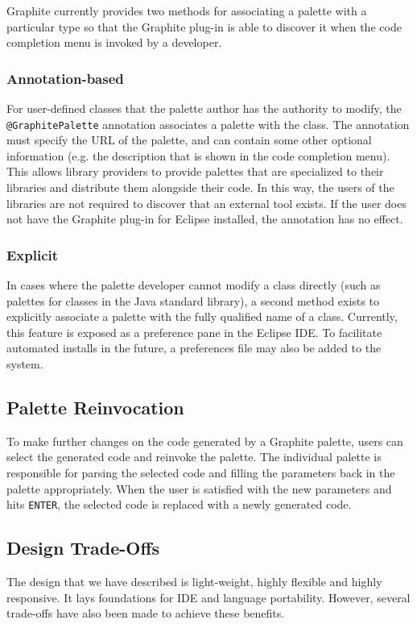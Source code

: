 \documentclass[10pt, conference, compsocconf]{IEEEtran}
\begin{document}
Graphite currently provides two methods for associating a palette with a particular type so that the Graphite plug-in is able to discover it when the code completion menu is invoked by a developer.

\subsubsection{Annotation-based}
For user-defined classes that the palette author has the authority to modify, the \texttt{@GraphitePalette} annotation associates a palette with the class. The annotation must specify the URL of the palette, and can contain some other optional information (e.g. the description that is shown in the code completion menu). This  allows library providers to provide palettes that are specialized to their libraries and distribute them alongside their code. In this way, the users of the libraries are not required to discover that an external tool exists. If the user does not have the Graphite plug-in for Eclipse installed, the annotation has no effect.

\subsubsection{Explicit}
In cases where the palette developer cannot modify a class directly (such as palettes for classes in the Java standard library), a second method exists to explicitly associate a palette with the fully qualified name of a class. Currently, this feature is exposed as a preference pane in the Eclipse IDE. To facilitate automated installs in the future, a preferences file may also be added to the system.

\subsection{Palette Reinvocation}
To make further changes on the code generated by a Graphite palette, users can select the generated code and reinvoke the palette. The individual palette is responsible for parsing the selected code and filling the parameters back in the palette appropriately. When the user is satisfied with the new parameters and hits {\tt ENTER}, the selected code is replaced with a newly generated code.

\subsection{Design Trade-Offs}
The design that we have described is light-weight, highly flexible and highly responsive. It lays foundations for IDE and language portability. However, several trade-offs have also been made to achieve these benefits.
\end{document}
